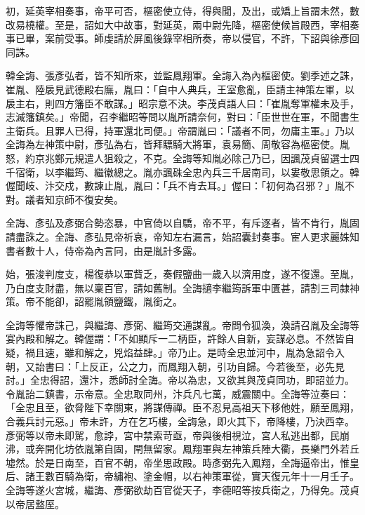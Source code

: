 \begin{pinyinscope}
 初，延英宰相奏事，帝平可否，樞密使立侍，得與聞，及出，或矯上旨謂未然，數改易橈權。至是，詔如大中故事，對延英，兩中尉先降，樞密使候旨殿西，宰相奏事已畢，案前受事。師虔請於屏風後錄宰相所奏，帝以侵官，不許，下詔與徐彥回同誅。



 韓全誨、張彥弘者，皆不知所來，並監鳳翔軍。全誨入為內樞密使。劉季述之誅，崔胤、陸扆見武德殿右廡，胤曰：「自中人典兵，王室愈亂，臣請主神策左軍，以扆主右，則四方籓臣不敢謀。」昭宗意不決。李茂貞語人曰：「崔胤奪軍權未及手，志滅籓鎮矣。」帝聞，召李繼昭等問以胤所請奈何，對曰：「臣世世在軍，不聞書生主衛兵。且罪人已得，持軍還北司便。」帝謂胤曰：「議者不同，勿庸主軍。」乃以全誨為左神策中尉，彥弘為右，皆拜驃騎大將軍，袁易簡、周敬容為樞密使。胤怒，約京兆鄭元規遣人狙殺之，不克。全誨等知胤必除己乃已，因諷茂貞留選士四千宿衛，以李繼筠、繼徽總之。胤亦諷硃全忠內兵三千居南司，以婁敬思領之。韓偓聞岐、汴交戍，數諫止胤，胤曰：「兵不肯去耳。」偓曰：「初何為召邪？」胤不對。議者知京師不復安矣。



 全誨、彥弘及彥弼合勢恣暴，中官倚以自驕，帝不平，有斥逐者，皆不肯行，胤固請盡誅之。全誨、彥弘見帝祈哀，帝知左右漏言，始詔囊封奏事。宦人更求麗姝知書者數十人，侍帝為內言冋，由是胤計多露。



 始，張浚判度支，楊復恭以軍貲乏，奏假鹽曲一歲入以濟用度，遂不復還。至胤，乃白度支財盡，無以稟百官，請如舊制。全誨擿李繼筠訴軍中匱甚，請割三司隸神策。帝不能卻，詔罷胤領鹽鐵，胤銜之。



 全誨等懼帝誅己，與繼誨、彥弼、繼筠交通謀亂。帝問令狐渙，渙請召胤及全誨等宴內殿和解之。韓偓謂：「不如顯斥一二柄臣，許餘人自新，妄謀必息。不然皆自疑，禍且速，雖和解之，兇焰益肆。」帝乃止。是時全忠並河中，胤為急詔令入朝，又詒書曰：「上反正，公之力，而鳳翔入朝，引功自歸。今若後至，必先見討。」全忠得詔，還汴，悉師討全誨。帝以為忠，又欲其與茂貞同功，即詔並力。令胤詒二鎮書，示帝意。全忠取同州，汴兵凡七萬，威震關中。全誨等泣奏曰：「全忠且至，欲脅陛下幸關東，將謀傳禪。臣不忍見高祖天下移他姓，願至鳳翔，合義兵討元惡。」帝未許，方在乞巧樓，全誨急，即火其下，帝降樓，乃決西幸。彥弼等以帝未即駕，愈誖，宮中禁索苛亟，帝與後相視泣，宮人私逃出都，民崩沸，或奔開化坊依胤第自固，閈無留家。鳳翔軍與左神策兵陣大衢，長樂門外若丘墟然。於是日南至，百官不朝，帝坐思政殿。時彥弼先入鳳翔，全誨逼帝出，惟皇后、諸王數百騎為衛，帝繡袍、塗金帽，以右神策軍從，實天復元年十一月壬子。全誨等遂火宮城，繼誨、彥弼欲劫百官從天子，李德昭等按兵衛之，乃得免。茂貞以帝居盩厔。




\end{pinyinscope}
